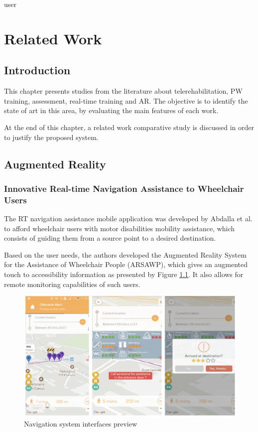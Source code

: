 user\chapter{Related Work}

\section{Introduction}

This chapter presents studies from the literature about telerehabilitation, PW training, assessment, real-time training and AR. The objective is to identify the state of art in this area, by evaluating the main features of each work.

At the end of this chapter, a related work comparative study is discussed in order to justify the proposed system.

\section{Augmented Reality}
\subsection{Innovative Real-time Navigation Assistance to Wheelchair Users}
The  RT navigation assistance mobile application was developed by Abdalla et al. \cite{abdallah2019} to afford wheelchair users with motor disabilities mobility assistance, which consists of guiding them from a source point to a desired destination. 

Based on the user needs, the authors developed the Augmented Reality System for the Assistance of Wheelchair People (ARSAWP), which gives an augmented touch to accessibility information as presented by Figure \ref{fig:abdallah2019}. It also allows for remote monitoring capabilities of such users. 

\begin{figure}[!hbt]
\begin{center}
\includegraphics[width=0.9 \textwidth]{img/cap3/abdallah2019}
\caption{Navigation system interfaces preview \cite{abdallah2019}}
\label{fig:abdallah2019}
\end{center}
\end{figure}


